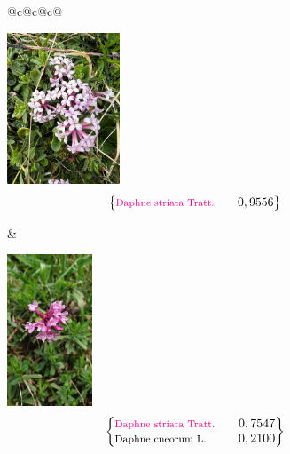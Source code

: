 \documentclass[a4paper,12pt]{article}
\begin{document}
\vspace{0.2cm}

\begin{figure}[H]
    \centering
    \begin{tabular}{@{}c@{\hspace{1mm}}c@{\hspace{1mm}}c@{}}
        \begin{minipage}[t]{0.33\textwidth}
            \centering
            \includegraphics[width=\linewidth,height=4.5cm,keepaspectratio]{images/Daphne_1.jpeg}
            \[ \left\{ \begin{array}{@{}p{3.3cm}@{\hspace{2mm}}r@{}}
                \footnotesize\textcolor{magenta}{Daphne striata Tratt.} & \footnotesize 0,9556
            \end{array} \right\} \]
        \end{minipage}
        & 
        \begin{minipage}[t]{0.33\textwidth}
            \centering
            \includegraphics[width=\linewidth,height=4.5cm,keepaspectratio]{images/Daphne_2.jpeg}
            \[ \left\{ \begin{array}{@{}p{3.3cm}@{\hspace{2mm}}r@{}}
                \footnotesize\textcolor{magenta}{Daphne striata Tratt.} & \footnotesize 0,7547 \\
                \footnotesize Daphne cneorum L. & \footnotesize 0,2100
            \end{array} \right\} \]
        \end{minipage}

\end{tabular}
\end{figure}
\end{document}
